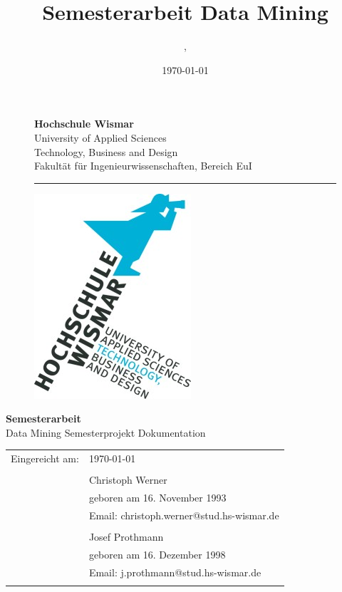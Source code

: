 \documentclass[12pt,					%
							 oneside,			%
							 a4paper,			%
							 halfparskip,		%
							 liststotoc,			%
							 bibtotoc,			%
							 fleqn,				%
							 pointlessnumbers]	%
							 {scrreprt}
\title{Semesterarbeit Data Mining}
\author{\VerfasserC, \Verfasserj}
\date{\today{}}
\makeatletter
\newcommand{\VerfasserJ}{Josef Prothmann}
\newcommand{\GeburtstagJ}{16. Dezember 1998}
\newcommand{\GeburtsortJ}{Dannenberg/ Elbe}
\newcommand{\EmailJ}{j.prothmann@stud.hs-wismar.de}
\newcommand{\VerfasserC}{Christoph Werner}
\newcommand{\GeburtstagC}{16. November 1993}
\newcommand{\EmailC}{christoph.werner@stud.hs-wismar.de}
\newcommand{\Titel}{Data Mining Semesterprojekt Dokumentation}
\makeatother
\begin{document}

	\renewcommand\lstlistingname{Code}
	\renewcommand\lstlistlistingname{Codeverzeichnis}
	
	\begin{titlepage}
		\setlength\headsep{-5mm}
		\begin{figure}[!h]
			\begin{minipage}{0.8\textwidth}
				\textbf{Hochschule Wismar} \\
				University of Applied Sciences \\
				Technology, Business and Design \\
				Fakultät für Ingenieurwissenschaften, Bereich EuI \\
			\rule{\textwidth}{0.5pt}
			\end{minipage}
			\begin{minipage}[r]{0.1\textwidth}
				\begin{flushright}
					\includegraphics[height=6\baselineskip]{pictures/HS-Wismar_Logo-FIW_2010-01.jpg}
				\end{flushright}
			\end{minipage}
		\end{figure}
		\vspace*{6cm}
		\begin{center}
			\Huge
			\textbf{Semesterarbeit} \\
			\vspace{2cm}
			\large \Titel
			\begin{table}[b]
				\begin{tabular}{rl}
					
					Eingereicht am: &\today \\
					\\
					  & \VerfasserC \\ 
					& geboren am \GeburtstagC \\ 
					& Email: \EmailC \\
					\\
					 & \VerfasserJ \\ 
					& geboren am \GeburtstagJ \\ 
					& Email: \EmailJ \\
					\\


\end{tabular}
\end{table}
\end{center}
\end{titlepage}
\end{document}

